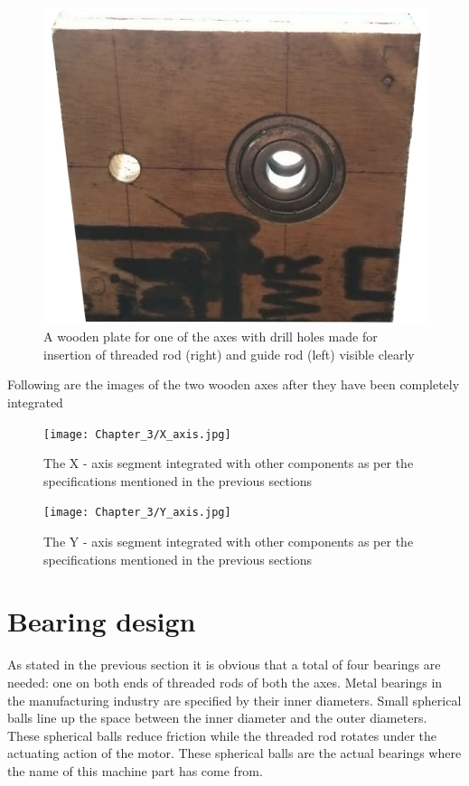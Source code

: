 \begin{figure}[h]
 \centering
 \includegraphics[scale=0.3]{images/Chapter_3/XY_plate.jpg}
 \caption{A wooden plate for one of the axes with drill holes made for insertion of threaded rod (right) and guide rod (left) visible clearly}
 \label{fig:plate}
\end{figure} \pagebreak

Following are the images of the two wooden axes after they have been completely integrated

\begin{figure}[h]
 \centering
 \texttt{[image: Chapter\_3/X\_axis.jpg]}
 \caption{The X -  axis segment integrated with other components as per the specifications mentioned in the previous sections}
 \label{fig:x_axis_complete}
\end{figure}

\begin{figure}[h]
 \centering
 \texttt{[image: Chapter\_3/Y\_axis.jpg]}
 \caption{The Y -  axis segment integrated with other components as per the specifications mentioned in the previous sections}
 \label{fig:y_axis_complete}
\end{figure}

\section{Bearing design}

As stated in the previous section it is obvious that a total of four bearings are needed: one on both ends of threaded rods of both the axes. Metal bearings in the manufacturing industry are specified by their inner diameters. Small spherical balls line up the space between the inner diameter and the outer diameters. These spherical balls reduce friction while the threaded rod rotates under the actuating action of the motor. These spherical balls are the actual bearings where the name of this machine part has come from. \par

